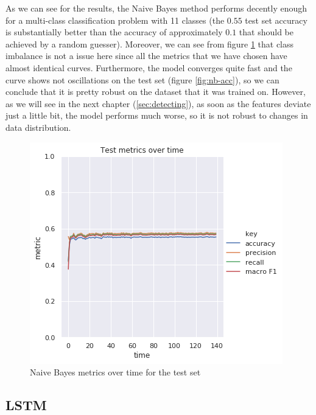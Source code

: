 \documentclass[12pt]{extreport}
\begin{document}
As we can see for the results, the Naive Bayes method performs decently enough for a multi-class classification problem with 11 classes (the $0.55$ test set accuracy is substantially better than the accuracy of approximately $0.1$ that should be achieved by a random guesser). Moreover, we can see from figure \ref{fig:nb-metrics} that class imbalance is not a issue here since all the metrics that we have chosen have almost identical curves. Furthermore, the model converges quite fast and the curve shows not oscillations on the test set (figure \ref{fig:nb-acc}), so we can conclude that it is pretty robust on the dataset that it was trained on. However, as we will see in the next chapter (\ref{sec:detecting}), as soon as the features deviate just a little bit, the model performs much worse, so it is not robust to changes in data distribution.

\begin{figure}[H]
\centering
\includegraphics[width=0.8\linewidth]{assets/framework/nb_BERT_test_metrics_holdout.png}
\caption{Naive Bayes metrics over time for the test set}
\label{fig:nb-metrics}
\end{figure}

\subsection{LSTM} \label{sec:lstm}
\end{document}
